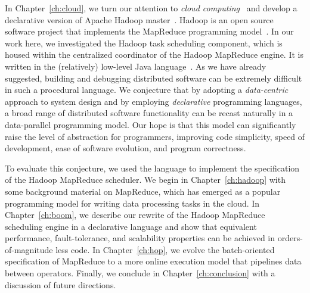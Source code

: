 In Chapter~\ref{ch:cloud}, we turn our attention to {\em cloud
computing}~\cite{abovetheclouds} and develop a declarative version of Apache
Hadoop master~\cite{hadoop}.  Hadoop is an open source software project that
implements the MapReduce programming model~\cite{mapreduce-osdi}.  In our work
here, we investigated the Hadoop task scheduling component, which is housed
within the centralized coordinator of the Hadoop MapReduce engine.  It is
written in the (relatively) low-level Java language~\cite{java}.  As we have
already suggested, building and debugging distributed software can be extremely
difficult in such a procedural language.  We conjecture that by adopting a {\em
data-centric} approach to system design and by employing {\em declarative}
programming languages, a broad range of distributed software functionality can
be recast naturally in a data-parallel programming model.  Our hope is that
this model can significantly raise the level of abstraction for programmers,
improving code simplicity, speed of development, ease of software evolution,
and program correctness.

To evaluate this conjecture, we used the \OVERLOG language to implement the
specification of the Hadoop MapReduce scheduler.  We begin in
Chapter~\ref{ch:hadoop} with some background material on MapReduce, which has
emerged as a popular programming model for writing data processing tasks in the
cloud.  In Chapter~\ref{ch:boom}, we describe our rewrite of the Hadoop
MapReduce scheduling engine in a declarative language and show that equivalent
performance, fault-tolerance, and scalability properties can be achieved in
orders-of-magnitude less code.  In Chapter~\ref{ch:hop}, we evolve the
batch-oriented specification of MapReduce to a more online execution model that
pipelines data between operators.  Finally, we conclude in
Chapter~\ref{ch:conclusion} with a discussion of future directions.




